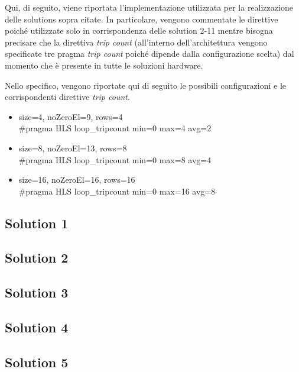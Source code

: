 Qui, di seguito, viene riportata l'implementazione utilizzata per la realizzazione delle solutions sopra citate. In particolare, vengono commentate le direttive poiché utilizzate solo in corrispondenza delle solution 2-11 mentre bisogna precisare che la direttiva \textit{trip count} (all'interno dell'architettura vengono specificate tre pragma \textit{trip count} poiché dipende dalla configurazione scelta) dal momento che è presente in tutte le soluzioni hardware.



Nello specifico, vengono riportate qui di seguito le possibili configurazioni e le corrispondenti direttive \textit{trip count}.
\begin{itemize}
	\item size=4, noZeroEl=9, rows=4 \\
	\#pragma HLS loop\_tripcount min=0 max=4 avg=2
	\item size=8, noZeroEl=13, rows=8 \\
	\#pragma HLS loop\_tripcount min=0 max=8 avg=4
	\item size=16, noZeroEl=16, rows=16 \\
	\#pragma HLS loop\_tripcount min=0 max=16 avg=8
\end{itemize}


\subsection{Solution 1}

\newpage

\subsection{Solution 2}

\newpage

\subsection{Solution 3}

\newpage

\subsection{Solution 4}

\newpage

\subsection{Solution 5}

\newpage

